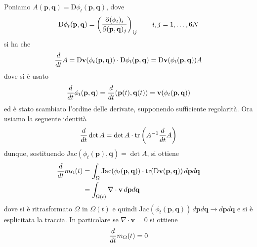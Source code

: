 \documentclass{article}
\begin{document}
Poniamo $A(\mathbf{p}, \mathbf{q}) = \mathrm{D}\phi_t(\mathbf{p}, \mathbf{q})$, dove
\begin{gather}
    \mathrm{D}\phi_t(\mathbf{p}, \mathbf{q}) = \left(\frac{\partial (\phi_t)_i}{\partial(\mathbf{p}, \mathbf{q})_j}\right)_{ij} \qquad i, j = 1, \dots, 6N \notag
\end{gather}
si ha che
\begin{gather}
    \frac{d}{dt}A = \mathrm{D}\mathbf{v}(\phi_t(\mathbf{p}, \mathbf{q})) \cdot \mathrm{D}\phi_t(\mathbf{p}, \mathbf{q}) = \mathrm{D}\mathbf{v}(\phi_t(\mathbf{p}, \mathbf{q}))A \notag
\end{gather}
dove si è usato
\begin{gather}
    \frac{d}{dt}\phi_t(\mathbf{p}, \mathbf{q}) = \frac{d}{dt}(\mathbf{p}(t), \mathbf{q}(t)) = \mathbf{v}(\phi_t(\mathbf{p}, \mathbf{q})) \notag
\end{gather}
ed è stato scambiato l'ordine delle derivate, supponendo sufficiente regolarità. Ora usiamo la seguente identità
\begin{gather}
    \frac{d}{dt}\det A = \det A \cdot \mathrm{tr}\left(A^{-1}\frac{d}{dt}A\right) \notag
\end{gather}
dunque, sostituendo $\mathrm{Jac}(\phi_t(\mathbf{p}), \mathbf{q}) = \det A$, si ottiene
\begin{align}
    \frac{d}{dt}m_\Omega(t) &= \int_\Omega \mathrm{Jac}(\phi_t(\mathbf{p}, \mathbf{q}))\cdot\mathrm{tr}(\mathrm{D}\mathbf{v}(\mathbf{p}, \mathbf{q})) \, d\mathbf{p}d\mathbf{q} \notag \\
    &= \int_{\Omega(t)} \nabla \cdot \mathbf{v} \, d\mathbf{p}d\mathbf{q} \notag
\end{align}
dove si è ritrasformato $\Omega$ in $\Omega(t)$ e quindi $\mathrm{Jac}(\phi_t(\mathbf{p}, \mathbf{q})) \, d\mathbf{p}d\mathbf{q} \rightarrow d\mathbf{p}d\mathbf{q}$ e si è esplicitata la traccia. In particolare se $\nabla \cdot \mathbf{v} = 0$ si ottiene
\begin{gather}
    \frac{d}{dt}m_\Omega(t) = 0 \notag
\end{gather}
\end{document}
